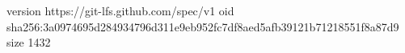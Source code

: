 version https://git-lfs.github.com/spec/v1
oid sha256:3a0974695d284934796d311e9eb952fc7df8aed5afb39121b71218551f8a87d9
size 1432
